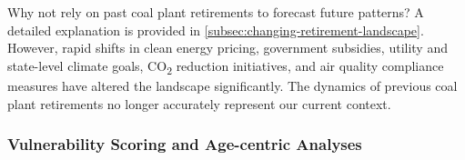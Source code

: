 Why not rely on past coal plant retirements to forecast future patterns? A detailed explanation is provided in \ref{subsec:changing-retirement-landscape}. 
However, rapid shifts in clean energy pricing, government subsidies, utility and state-level climate goals, CO\textsubscript{2} reduction initiatives, and air quality 
compliance measures have altered the landscape significantly. The dynamics of previous coal plant retirements no longer accurately represent our current context.







\subsubsection*{Vulnerability Scoring and Age-centric Analyses}

